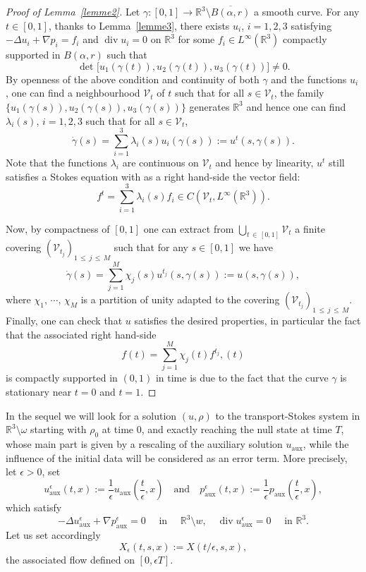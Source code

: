 \documentclass[AHL,Unicode,longabstracts,published]{cedram}
\newcommand{\aux}{\mathrm{aux}}
\newcommand{\R}{\mathbb{R}}
\newcommand{\clV}{\mathcal{V}}
\renewcommand{\leq}{\leqslant}
\renewcommand{\div}{\operatorname{div}}
\newcommand{\eps}{\epsilon}
\begin{document}
\begin{proof}[Proof of Lemma~\ref{lemme2}]
Let $\gamma : [0,1] \to \R^3 \setminus \overline{B(\alpha,r)}$ a smooth curve. For any $t \in [0,1]$, thanks to Lemma~\ref{lemme3}, there exists $u_i$, $i=1,2,3$ satisfying $ -\Delta u_i+\nabla p_i = f_i$ and $\div u_i=0$ on $\R^3$ for some $f_i \in L^\infty(\R^3) $ compactly supported in $B(\alpha,r)$ such that
\[
\text{ det } \big[u_1(\gamma(t)),u_2(\gamma(t)),u_3(\gamma(t)) \big] \neq 0.
\]
By openness of the above condition and continuity of both $\gamma$ and the functions $u_i$, one can find a neighbourhood $\clV_t$ of $t$ such that for all $s \in \clV_t$, the family $\{u_1(\gamma(s)),u_2(\gamma(s)),u_3(\gamma(s))\} $ generates $\R^3$ and hence one can find $\lambda_i(s)$, $i=1,2,3$ such that for all $s \in \clV_t$,
\[
\dot{\gamma}(s)=\underset{i=1}{\overset{3}{\sum}} \lambda_i(s) u_i(\gamma(s)) :=u^t(s,\gamma(s)).
\]
Note that the functions $\lambda_i$ are continuous on $\clV_t$ and hence by linearity, $u^t$ still satisfies a Stokes equation with as a right hand-side the vector field:
\[
f^t=\underset{i=1}{\overset{3}{\sum}} \lambda_i(s)f_i\in C\left(\clV_t,L^\infty\left(\R^3\right)\right).
\]

Now, by compactness of $[0,1]$ one can extract from $ {\bigcup}_{t\,\in\,[0,1]} \clV_t$ a finite covering $(\clV_{t_j})_{1\,\leq\,j\,\leq\,M}$ such that for any $s \in [0,1]$ we have
\[
\dot{\gamma}(s)=\underset{j=1}{\overset{M}{\sum}} \chi_j(s) u^{t_j}(s,\gamma(s)):=u(s,\gamma(s)),
\]
where $\chi_1,\,\cdots,\,\chi_M$ is a partition of unity adapted to the covering $(\clV_{t_j})_{1\,\leq\,j\,\leq\,M}$. Finally, one can check that $u$ satisfies the desired properties, in particular the fact that the associated right hand-side
\[
f(t)=\underset{j=1}{\overset{M}{\sum}} \chi_j(t) f^{t_j},(t)
\]
is compactly supported in $(0,1)$ in time is due to the fact that the curve $\gamma$ is stationary near $t=0$ and $t=1$.
\end{proof}



In the sequel we will look for a solution $ (u,\rho)$ to the transport-Stokes system in $\R^3 \setminus \omega$ starting with $\rho_0$ at time $0$, and exactly reaching the null state at time $T$, whose main part is given by a rescaling of the auxiliary solution $u_\aux$, while the influence of the initial data will be considered as an error term. More precisely, let $\eps>0$, set
\[
u^\eps_\aux(t,x):=\frac{1}{\eps}u_\aux\left(\frac{t}{\eps},x\right) \quad \text{and} \quad
p^\eps_\aux(t,x):=\frac{1}{\eps} p_\aux\left(\frac{t}{\eps},x\right),
\]
which satisfy
\begin{equation}\label{s*}
-\Delta u^\eps_\aux +\nabla p^\eps_\aux = 0 \quad \text{ in } \quad \R^3 \setminus w, \quad
\div u^\eps_\aux=0 \quad \text{ in }
\R^3.
\end{equation}
Let us set accordingly
\[
X_\eps(t,s,x):=X(t/\eps,s,x),
\]
the associated flow defined on $[0,\eps T]$.
\end{document}
